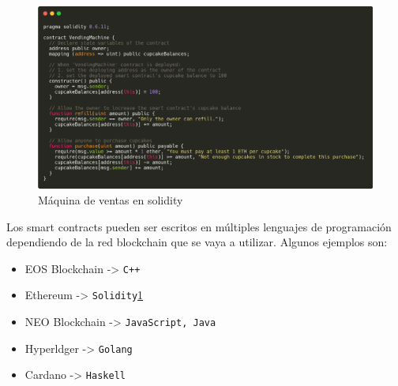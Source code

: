% 
% 
% 
% 

\begin{figure}[h!]
  \centering
  \includegraphics[width=0.8\linewidth]{figs/EstadoArte/Blockchain/SmartContractEjemplo}
  \caption[Máquina de ventas en solidity]{Máquina de ventas en solidity}
  \label{fig:smartContract}
\end{figure}


Los smart contracts pueden ser escritos en múltiples lenguajes de programación dependiendo de la red blockchain que se vaya a utilizar. Algunos ejemplos son:
\begin{itemize}
\item EOS Blockchain -> \verb|C++|
\item Ethereum -> \verb|Solidity|\ref{fig:smartContract}
\item NEO Blockchain -> \verb|JavaScript, Java|
\item Hyperldger -> \verb|Golang|
\item Cardano -> \verb|Haskell|
\end{itemize}


